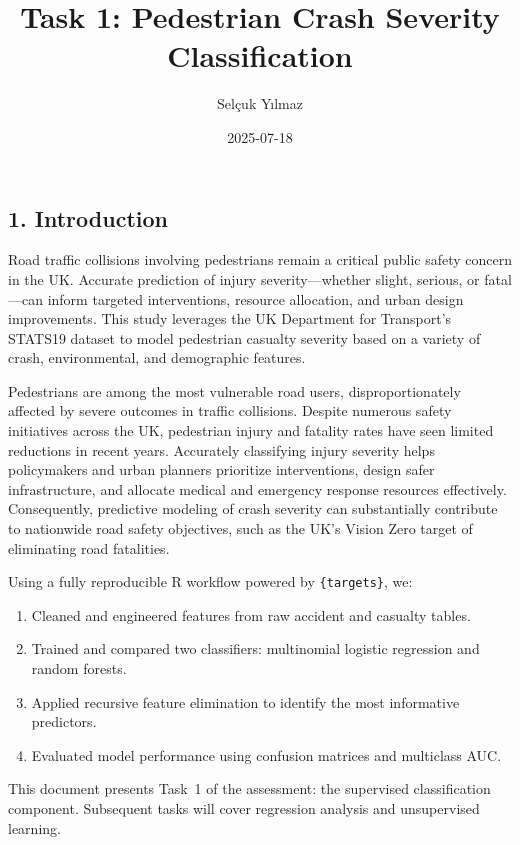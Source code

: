 \documentclass[
]{article}
\title{Task 1: Pedestrian Crash Severity Classification}
\author{Selçuk Yılmaz}
\date{2025-07-18}
\providecommand{\tightlist}{%
  \setlength{\itemsep}{0pt}\setlength{\parskip}{0pt}}
\begin{document}
\maketitle

{
\setcounter{tocdepth}{2}
\tableofcontents
}
\subsection{1. Introduction}\label{introduction}

Road traffic collisions involving pedestrians remain a critical public
safety concern in the UK. Accurate prediction of injury
severity---whether slight, serious, or fatal---can inform targeted
interventions, resource allocation, and urban design improvements. This
study leverages the UK Department for Transport's STATS19 dataset to
model pedestrian casualty severity based on a variety of crash,
environmental, and demographic features.

Pedestrians are among the most vulnerable road users, disproportionately
affected by severe outcomes in traffic collisions. Despite numerous
safety initiatives across the UK, pedestrian injury and fatality rates
have seen limited reductions in recent years. Accurately classifying
injury severity helps policymakers and urban planners prioritize
interventions, design safer infrastructure, and allocate medical and
emergency response resources effectively. Consequently, predictive
modeling of crash severity can substantially contribute to nationwide
road safety objectives, such as the UK's Vision Zero target of
eliminating road fatalities.

Using a fully reproducible R workflow powered by \texttt{\{targets\}},
we:

\begin{enumerate}
\def\labelenumi{\arabic{enumi}.}
\tightlist
\item
  Cleaned and engineered features from raw accident and casualty tables.
\item
  Trained and compared two classifiers: multinomial logistic regression
  and random forests.
\item
  Applied recursive feature elimination to identify the most informative
  predictors.
\item
  Evaluated model performance using confusion matrices and multiclass
  AUC.
\end{enumerate}

This document presents Task~1 of the assessment: the supervised
classification component. Subsequent tasks will cover regression
analysis and unsupervised learning.
\end{document}
